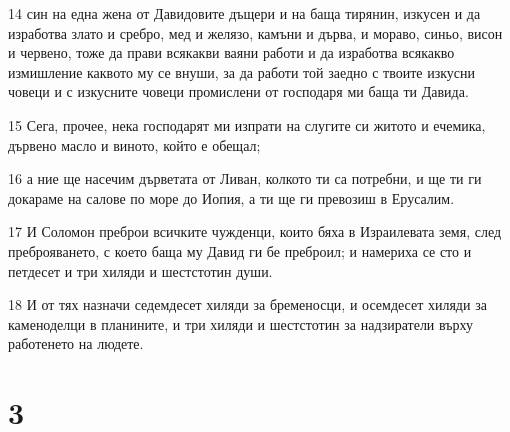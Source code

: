\par 14 син на една жена от Давидовите дъщери и на баща тирянин, изкусен и да изработва злато и сребро, мед и желязо, камъни и дърва, и мораво, синьо, висон и червено, тоже да прави всякакви ваяни работи и да изработва всякакво измишление каквото му се внуши, за да работи той заедно с твоите изкусни човеци и с изкусните човеци промислени от господаря ми баща ти Давида.
\par 15 Сега, прочее, нека господарят ми изпрати на слугите си житото и ечемика, дървено масло и виното, който е обещал;
\par 16 а ние ще насечим дърветата от Ливан, колкото ти са потребни, и ще ти ги докараме на салове по море до Иопия, а ти ще ги превозиш в Ерусалим.
\par 17 И Соломон преброи всичките чужденци, които бяха в Израилевата земя, след преброяването, с което баща му Давид ги бе преброил; и намериха се сто и петдесет и три хиляди и шестстотин души.
\par 18 И от тях назначи седемдесет хиляди за бременосци, и осемдесет хиляди за каменоделци в планините, и три хиляди и шестстотин за надзиратели върху работенето на людете.

\chapter{3}

